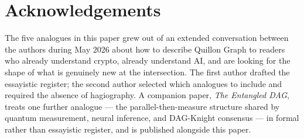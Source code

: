 \documentclass[11pt,a4paper]{article}
\begin{document}
\section*{Acknowledgements}

The five analogues in this paper grew out of an extended conversation
between the authors during May 2026 about how to describe Quillon Graph
to readers who already understand crypto, already understand AI, and
are looking for the shape of what is genuinely new at the intersection.
The first author drafted the essayistic register; the second author
selected which analogues to include and required the absence of
hagiography. A companion paper, \emph{The Entangled DAG}, treats one
further analogue --- the parallel-then-measure structure shared by
quantum measurement, neural inference, and DAG-Knight consensus --- in
formal rather than essayistic register, and is published alongside this
paper.
\end{document}
